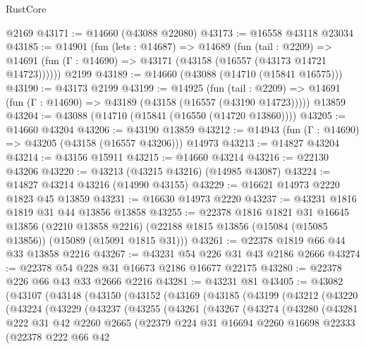 \begin{lexlean}{RustCore}
\begin{coremodule}
    @2169
@43171 := @14660 (@43088 @22080)
@43173 := @16558 @43118 @23034
@43185 := @14901
    (fun (lets : @14687) =>
    @14689
      (fun (tail : @2209) =>
      @14691 (fun (Γ : @14690) => @43171 (@43158 (@16557 (@43173 @14721 @14723))))))
    @2199
@43189 := @14660 (@43088 (@14710 (@15841 @16575)))
@43190 := @43173 @2199
@43199 := @14925
    (fun (tail : @2209) => @14691 (fun (Γ : @14690) => @43189 (@43158 (@16557 (@43190 @14723)))))
    @13859
@43204 := @43088 (@14710 (@15841 (@16550 (@14720 @13860))))
@43205 := @14660 @43204
@43206 := @43190 @13859
@43212 := @14943 (fun (Γ : @14690) => @43205 (@43158 (@16557 @43206))) @14973
@43213 := @14827 @43204
@43214 := @43156 @15911
@43215 := @14660 @43214
@43216 := @22130 @43206
@43220 := @43213 (@43215 @43216) (@14985 @43087)
@43224 := @14827 @43214 @43216 (@14990 @43155)
@43229 := @16621 @14973 @2220 @1823 @45 @13859
@43231 := @16630 @14973 @2220
@43237 := @43231 @1816 @1819 @31 @44 @13856 @13858
@43255 := @22378
    @1816
    @1821
    @31
    @16645
    @13856
    (@2210 @13858 @2216)
    (@22188 @1815 @13856 (@15084 (@15085 @13856)) (@15089 (@15091 @1815 @31)))
@43261 := @22378 @1819 @66 @44 @33 @13858 @2216
@43267 := @43231 @54 @226 @31 @43 @2186 @2666
@43274 := @22378 @54 @228 @31 @16673 @2186 @16677 @22175
@43280 := @22378 @226 @66 @43 @33 @2666 @2216
@43281 := @43231 @81
@43405 := @43082
    (@43107
      (@43148
        (@43150
          (@43152
            (@43169
              (@43185
                (@43199
                  (@43212
                    (@43220
                      (@43224
                        (@43229
                          (@43237
                            (@43255
                              (@43261
                                (@43267
                                  (@43274
                                    (@43280
                                      (@43281
                                        @222
                                        @31
                                        @42
                                        @2260
                                        @2665
                                        (@22379
                                          @224
                                          @31
                                          @16694
                                          @2260
                                          @16698
                                          @22333
                                          (@22378
                                            @222
                                            @66
                                            @42

\end{coremodule}
\end{lexlean}
